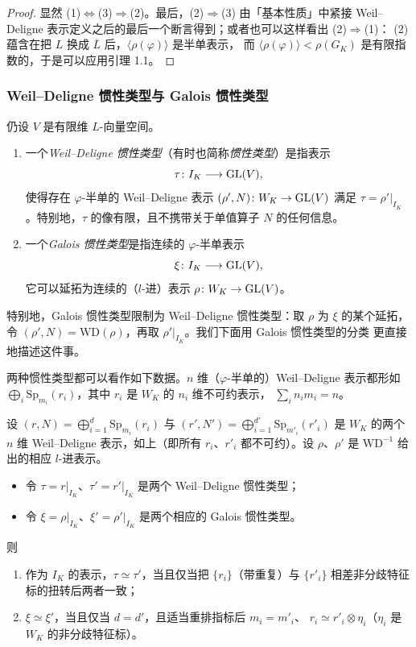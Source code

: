 \begin{proof}
显然 (1)$\Leftrightarrow$(3)$\Rightarrow$(2)。最后，(2)$\Rightarrow$(3) 由「基本性质」中紧接
Weil--Deligne 表示定义之后的最后一个断言得到；或者也可以这样看出 (2)$\Rightarrow$(1)：
(2) 蕴含在把 $L$ 换成 $\overline{L}$ 后，$\langle\rho(\varphi)\rangle$ 是半单表示，
而 $\langle\rho(\varphi)\rangle<\rho(G_K)$ 是有限指数的，于是可以应用引理 1.1。
\end{proof}

\subsubsection{Weil--Deligne 惯性类型与 Galois 惯性类型}

\begin{definition}
仍设 $V$ 是有限维 $L$-向量空间。
\begin{enumerate}[label=(\arabic*),leftmargin=2.2em]
\item 一个\emph{Weil--Deligne 惯性类型}（有时也简称\emph{惯性类型}）是指表示
\[
\tau\colon I_K\longrightarrow\mathrm{GL}(V),
\]
使得存在 $\varphi$-半单的 Weil--Deligne 表示 $(\rho',N)\colon W_K\to\mathrm{GL}(V)$ 满足
$\tau=\rho'|_{I_K}$。特别地，$\tau$ 的像有限，且不携带关于单值算子 $N$ 的任何信息。
\item 一个\emph{Galois 惯性类型}是指连续的 $\varphi$-半单表示
\[
\xi\colon I_K\longrightarrow\mathrm{GL}(V),
\]
它可以延拓为连续的（$l$-进）表示 $\rho\colon W_K\to\mathrm{GL}(V)$。
\end{enumerate}
\end{definition}

特别地，Galois 惯性类型限制为 Weil--Deligne 惯性类型：取 $\rho$ 为 $\xi$ 的某个延拓，
令 $(\rho',N)=\mathrm{WD}(\rho)$，再取 $\rho'|_{I_K}$。我们下面用 Galois 惯性类型的分类
更直接地描述这件事。

两种惯性类型都可以看作如下数据。$n$ 维（$\varphi$-半单的）Weil--Deligne 表示都形如
$\bigoplus_i\mathrm{Sp}_{m_i}(r_i)$，其中 $r_i$ 是 $W_K$ 的 $n_i$ 维不可约表示，
$\sum_i n_im_i=n$。

\begin{lemma}
设 $(r,N)=\bigoplus_{i=1}^{d}\mathrm{Sp}_{m_i}(r_i)$ 与
$(r',N')=\bigoplus_{i=1}^{d'}\mathrm{Sp}_{m'_i}(r'_i)$ 是 $W_K$ 的两个 $n$ 维
Weil--Deligne 表示，如上（即所有 $r_i$、$r'_i$ 都不可约）。设 $\rho$、$\rho'$ 是
$\mathrm{WD}^{-1}$ 给出的相应 $l$-进表示。
\begin{itemize}[leftmargin=1.6em]
\item 令 $\tau=r|_{I_K}$、$\tau'=r'|_{I_K}$ 是两个 Weil--Deligne 惯性类型；
\item 令 $\xi=\rho|_{I_K}$、$\xi'=\rho'|_{I_K}$ 是两个相应的 Galois 惯性类型。
\end{itemize}
则
\begin{enumerate}[label=(\arabic*),leftmargin=2.2em]
\item 作为 $I_K$ 的表示，$\tau\simeq\tau'$，当且仅当把 $\{r_i\}$（带重复）与 $\{r'_i\}$
      相差非分歧特征标的扭转后两者一致；
\item $\xi\simeq\xi'$，当且仅当 $d=d'$，且适当重排指标后 $m_i=m'_i$、
      $r_i\simeq r'_i\otimes\eta_i$（$\eta_i$ 是 $W_K$ 的非分歧特征标）。
\end{enumerate}
\end{lemma}


